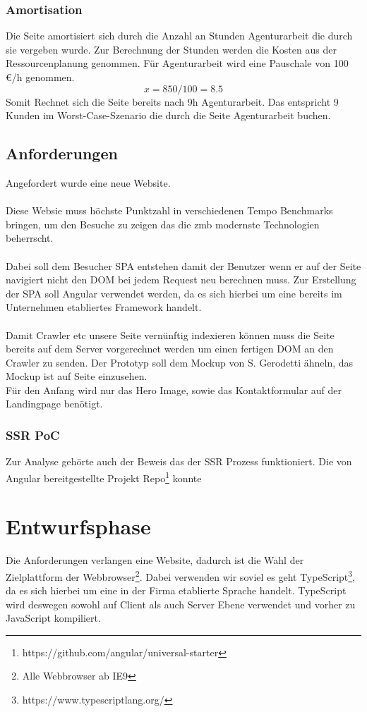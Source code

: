 \documentclass[11pt,a4paper]{article}
\begin{document}
\subsubsection{Amortisation}
Die Seite amortisiert sich durch die Anzahl an Stunden Agenturarbeit die durch sie vergeben wurde.
Zur Berechnung der Stunden werden die Kosten aus der Ressourcenplanung genommen. Für Agenturarbeit wird eine  Pauschale von 100 €/h genommen.\\
\begin{equation*}
x = 850 / 100 = 8.5
\end{equation*}
Somit Rechnet sich die Seite bereits nach 9h Agenturarbeit. Das entspricht 9 Kunden im Worst-Case-Szenario die durch die Seite Agenturarbeit buchen.
\subsection{Anforderungen}
Angefordert wurde eine neue Website.\\\\
Diese Websie muss höchste Punktzahl in verschiedenen Tempo Benchmarks bringen, um den Besuche zu zeigen das die zmb modernste Technologien beherrscht.\\\\
Dabei soll dem Besucher \acs{SPA} entstehen damit der Benutzer wenn er auf der Seite navigiert nicht den \acs{DOM} bei jedem Request neu berechnen muss. 
Zur Erstellung der SPA soll Angular verwendet werden, da es sich hierbei um eine bereits im Unternehmen etabliertes Framework handelt.\\\\
Damit Crawler etc unsere Seite vernünftig indexieren können muss die Seite bereits auf dem Server vorgerechnet werden um einen fertigen \acs{DOM} an den Crawler zu senden.
Der Prototyp soll dem Mockup von S. Gerodetti ähneln, das Mockup ist auf Seite \pageref{tbl:Übersicht der Zeitplanung} einzusehen.\\Für den Anfang wird nur das Hero Image, sowie das Kontaktformular auf der Landingpage benötigt. 
\subsubsection{SSR PoC}
Zur Analyse gehörte auch der Beweis das der SSR Prozess funktioniert. Die von Angular bereitgestellte Projekt Repo\footnote{https://github.com/angular/universal-starter} konnte
\section{Entwurfsphase}
Die Anforderungen verlangen eine Website, dadurch ist die Wahl der Zielplattform der Webbrowser\footnote{Alle Webbrowser ab IE9}. Dabei verwenden wir soviel es geht TypeScript\footnote{https://www.typescriptlang.org/}, da es sich hierbei um eine in der Firma etablierte Sprache handelt. TypeScript wird deswegen sowohl auf Client als auch Server Ebene verwendet und vorher zu JavaScript kompiliert. 
\end{document}
